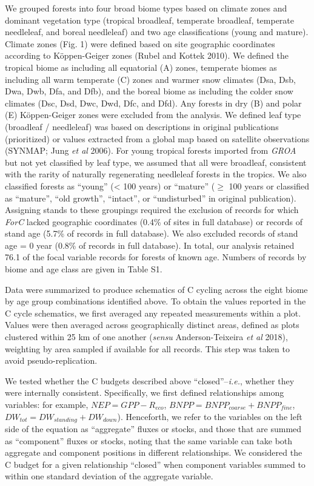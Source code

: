 \documentclass[
]{article}
\begin{document}
We grouped forests into four broad biome types based on climate zones
and dominant vegetation type (tropical broadleaf, temperate broadleaf,
temperate needleleaf, and boreal needleleaf) and two age classifications
(young and mature). Climate zones (Fig. 1) were defined based on site
geographic coordinates according to Köppen-Geiger zones (Rubel and
Kottek 2010). We defined the tropical biome as including all equatorial
(A) zones, temperate biomes as including all warm temperate (C) zones
and warmer snow climates (Dsa, Dsb, Dwa, Dwb, Dfa, and Dfb), and the
boreal biome as including the colder snow climates (Dsc, Dsd, Dwc, Dwd,
Dfc, and Dfd). Any forests in dry (B) and polar (E) Köppen-Geiger zones
were excluded from the analysis. We defined leaf type (broadleaf /
needleleaf) was based on descriptions in original publications
(prioritized) or values extracted from a global map based on satellite
observations (SYNMAP; Jung \emph{et al} 2006). For young tropical
forests imported from \emph{GROA} but not yet classified by leaf type,
we assumed that all were broadleaf, consistent with the rarity of
naturally regenerating needleleaf forests in the tropics. We also
classified forests as ``young'' (\textless{} 100 years) or ``mature''
(\(\ge\) 100 years or classified as ``mature'', ``old growth'',
``intact'', or ``undisturbed'' in original publication). Assigning
stands to these groupings required the exclusion of records for which
\emph{ForC} lacked geographic coordinates (0.4\% of sites in full
database) or records of stand age (5.7\% of records in full database).
We also excluded records of stand age = 0 year (0.8\% of records in full
database). In total, our analysis retained 76.1 of the focal variable
records for forests of known age. Numbers of records by biome and age
class are given in Table S1.

Data were summarized to produce schematics of C cycling across the eight
biome by age group combinations identified above. To obtain the values
reported in the C cycle schematics, we first averaged any repeated
measurements within a plot. Values were then averaged across
geographically distinct areas, defined as plots clustered within 25 km
of one another (\emph{sensu} Anderson-Teixeira \emph{et al} 2018),
weighting by area sampled if available for all records. This step was
taken to avoid pseudo-replication.

We tested whether the C budgets described above ``closed''--\emph{i.e.},
whether they were internally consistent. Specifically, we first defined
relationships among variables: for example, \(NEP = GPP - R_{eco}\),
\(BNPP = BNPP_{coarse} + BNPP_{fine}\),
\(DW_{tot} = DW_{standing} + DW_{down}\)). Henceforth, we refer to the
variables on the left side of the equation as ``aggregate'' fluxes or
stocks, and those that are summed as ``component'' fluxes or stocks,
noting that the same variable can take both aggregate and component
positions in different relationships. We considered the C budget for a
given relationship ``closed'' when component variables summed to within
one standard deviation of the aggregate variable.
\end{document}
